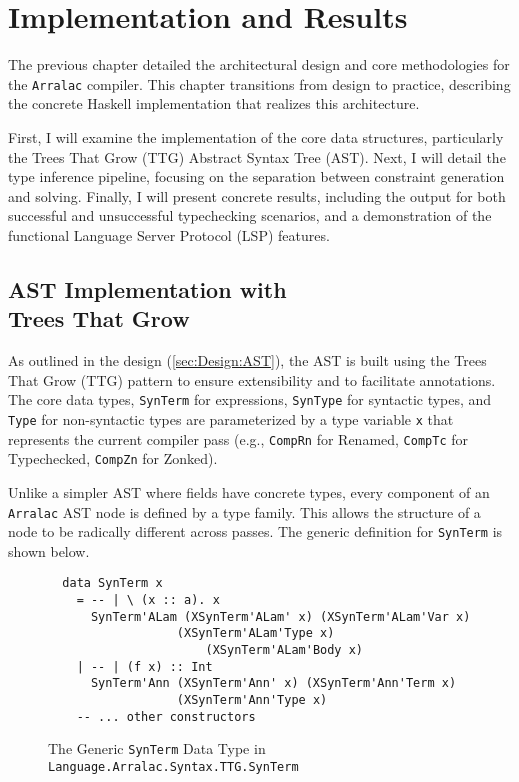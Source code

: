 \chapter{Implementation and Results}
\label{chap:ImplementationAndResults}

The previous chapter detailed the architectural design and core methodologies for the \texttt{Arralac} compiler. This chapter transitions from design to practice, describing the concrete Haskell implementation that realizes this architecture.

First, I will examine the implementation of the core data structures, particularly the Trees That Grow (TTG) Abstract Syntax Tree (AST). Next, I will detail the type inference pipeline, focusing on the separation between constraint generation and solving. Finally, I will present concrete results, including the output for both successful and unsuccessful typechecking scenarios, and a demonstration of the functional Language Server Protocol (LSP) features.

\section[AST Implementation with Trees That Grow]{AST Implementation with \\ Trees That Grow}
\label{sec:Implementation:AST}

As outlined in the design (\cref{sec:Design:AST}), the AST is built using the Trees That Grow (TTG) pattern to ensure extensibility and to facilitate annotations. The core data types, \texttt{SynTerm} for expressions, \texttt{SynType} for syntactic types, and \texttt{Type} for non-syntactic types are parameterized by a type variable \texttt{x} that represents the current compiler pass (e.g., \texttt{CompRn} for Renamed, \texttt{CompTc} for Typechecked, \texttt{CompZn} for Zonked).

Unlike a simpler AST where fields have concrete types, every component of an \texttt{Arralac} AST node is defined by a type family. This allows the structure of a node to be radically different across passes. The generic definition for \texttt{SynTerm} is shown below.

\begin{figure}
  \centering
  \begin{verbatim}
  data SynTerm x
    = -- | \ (x :: a). x
      SynTerm'ALam (XSynTerm'ALam' x) (XSynTerm'ALam'Var x) 
                  (XSynTerm'ALam'Type x) 
                      (XSynTerm'ALam'Body x)
    | -- | (f x) :: Int
      SynTerm'Ann (XSynTerm'Ann' x) (XSynTerm'Ann'Term x) 
                  (XSynTerm'Ann'Type x)
    -- ... other constructors
  \end{verbatim}
  \caption[The Generic \texttt{SynTerm} Data Type]{The Generic \texttt{SynTerm} Data Type in \\ \texttt{Language.Arralac.Syntax.TTG.SynTerm}}
\end{figure}

